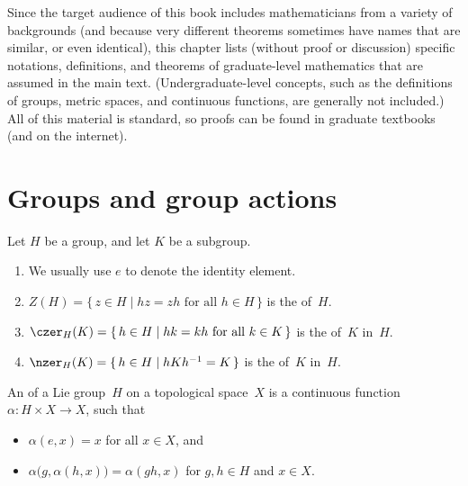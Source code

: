 
 \label{BackChap}

Since the target audience of this book includes mathematicians from a variety of backgrounds (and because very different theorems sometimes have names that are similar, or even identical), this chapter lists (without proof or discussion) specific notations, definitions, and theorems of graduate-level mathematics that are assumed in the main text. (Undergraduate-level concepts, such as the definitions of groups, metric spaces, and continuous functions, are generally not included.)
All of this material is standard, so proofs can be found in graduate textbooks (and on the internet).



\section{Groups and group actions}

\begin{notation} 
Let $H$ be a group, and let $K$ be a subgroup.
	\begin{enumerate}
	\item {}%
	We usually use $e$ to denote the identity element.
	
	\item {}%
	$Z(H) = \{\, z \in H \mid \text{$hz = zh$ for all $h \in H$} \,\}$ is the  of~$H$.
	
	\item {}%
	$\czer_H(K) = \{\,h \in H \mid \text{$h k = kh$ for all $k \in K$}\,\}$ is the  of~$K$ in~$H$.
	
	\item {}%
	$\nzer_H(K) = \{\, h \in H \mid h K h^{-1} = K \,\}$ is the  of~$K$ in~$H$.
	\end{enumerate}
\end{notation}


\begin{defn}
An  of a Lie group~$H$ on a topological space~$X$ is a
continuous function $\alpha \colon H \times X \to X$, such that
 \begin{itemize}
 \item $\alpha(e,x) = x$ for all $x \in X$, and
 \item $\alpha \bigl( g, \alpha(h,x) \bigr) = \alpha(gh,x)$
for $g,h \in H$ and $x \in X$.
\end{itemize}
 \end{defn}

